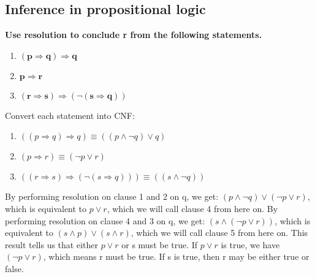 \subsection{Inference in propositional logic}
\begin{large}
    \textbf{Use resolution to conclude r from the following statements.}
    \begin{enumerate}
        \item $ \mathbf{(p \Rightarrow q) \Rightarrow q }$
        \item $ \mathbf{p \Rightarrow r }$
        \item $ \mathbf{(r \Rightarrow s) \Rightarrow (\neg (s \Rightarrow q))} $
    \end{enumerate}
    Convert each statement into CNF\@:
    \begin{enumerate}
        \item $ ((p \Rightarrow q) \Rightarrow q) \equiv ((p \land \neg q) \lor q) $
        \item $ (p \Rightarrow r) \equiv (\neg p \lor r) $
        \item $ ((r \Rightarrow s) \Rightarrow (\neg (s \Rightarrow q))) \equiv ((s \land \neg q))$
    \end{enumerate}
    By performing resolution on clause 1 and 2 on q, we get:
    $ (p \land \neg q) \lor (\neg p \lor r)  $, which is equivalent to $ p \lor r $, which we will call clause 4 from here on.
    By performing resolution on clause 4 and 3 on q, we get:
    $ (s \land (\neg p \lor r)) $, which is equivalent to $ (s \land p) \lor (s \land r) $, which we will call clause 5 from here on.
    This result tells us that either $ p \lor r $ or s must be true.
    If $ p \lor r $ is true, we have $ (\neg p \lor r) $, which means r must be true.
    If s is true, then r may be either true or false.
\end{large}